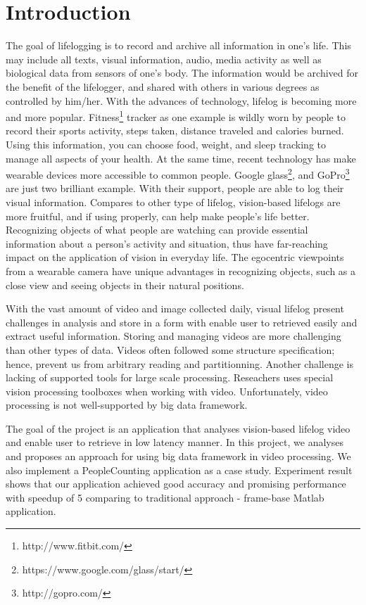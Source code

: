 \section{Introduction}
\label{sec:sec_intro}

The goal of lifelogging is to record and archive all information in one's life. 
This may include all texts, visual information, audio, media activity as well 
as biological data from sensors of one's body. The information would be archived
for the benefit of the lifelogger, and shared with others in various degrees as
controlled by him/her.  With the advances of technology, lifelog is becoming more
 and more popular. Fitness\footnote{http://www.fitbit.com/} tracker as one
 example is wildly worn by people to record  their sports activity, steps taken, distance traveled and calories
 burned.  Using this information, you can choose food, weight, and sleep
 tracking  to manage all aspects of your health.  At the same time, recent 
 technology has make wearable devices more accessible to common people. Google
 glass\footnote{https://www.google.com/glass/start/}, and
 GoPro\footnote{http://gopro.com/} are just two brilliant example. With their support, people are able to log their visual information.
Compares to other type of lifelog, vision-based lifelogs are more fruitful, and
if using properly, can help make people's life better. Recognizing objects of 
what people are watching can provide essential information about a person's 
activity and situation, thus have far-reaching impact on the application of 
vision in everyday life. The egocentric viewpoints from a wearable camera have
unique advantages in recognizing objects, such as a close view and seeing
objects in their natural positions.

With the vast amount of video and image collected daily, visual lifelog present 
challenges in analysis and store in a form with enable user to retrieved easily 
and extract useful information. Storing and managing videos are more challenging
than other types of data. Videos often followed some structure specification;
hence, prevent us from arbitrary reading and partitionning. Another challenge
is lacking of supported tools for large scale processing. Reseachers uses
special vision processing toolboxes when working with video. Unfortunately,
video processing is not well-supported by big data framework.

The goal of the project is an application that 
analyses vision-based lifelog video and enable user to retrieve in low
latency manner. In this project, we analyses and proposes an approach for using
big data framework in video processing. We also implement a PeopleCounting
application as a case study. Experiment result shows that our application
achieved good accuracy and promising performance with speedup of 5 comparing to
traditional approach - frame-base Matlab application.

